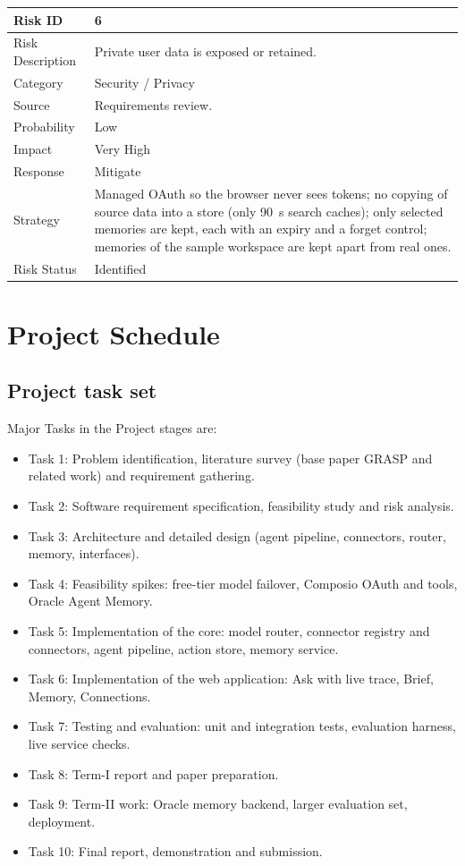 \begin{table}[!htbp]
\begin{center}
\def\arraystretch{1.5}
\begin{tabularx}{\textwidth}{| l | X |}
\hline
Risk ID	& 6 \\ \hline
Risk Description	& Private user data is exposed or retained. \\ \hline
Category	& Security / Privacy \\ \hline
Source	& Requirements review. \\ \hline
Probability	& Low \\ \hline
Impact	& Very High \\ \hline
Response	& Mitigate \\ \hline
Strategy	& Managed OAuth so the browser never sees tokens; no copying of source data into a store (only 90~s search caches); only selected memories are kept, each with an expiry and a forget control; memories of the sample workspace are kept apart from real ones. \\ \hline
Risk Status	& Identified \\ \hline
\end{tabularx}
\end{center}
\label{tab:risk6}
\end{table}

\section{Project Schedule}
\label{sec:schedule}
\subsection{Project task set}
\label{sec:taskset}
Major Tasks in the Project stages are:
\begin{itemize}
  \item Task 1: Problem identification, literature survey (base paper GRASP and related work) and requirement gathering.
  \item Task 2: Software requirement specification, feasibility study and risk analysis.
  \item Task 3: Architecture and detailed design (agent pipeline, connectors, router, memory, interfaces).
  \item Task 4: Feasibility spikes: free-tier model failover, Composio OAuth and tools, Oracle Agent Memory.
  \item Task 5: Implementation of the core: model router, connector registry and connectors, agent pipeline, action store, memory service.
  \item Task 6: Implementation of the web application: Ask with live trace, Brief, Memory, Connections.
  \item Task 7: Testing and evaluation: unit and integration tests, evaluation harness, live service checks.
  \item Task 8: Term-I report and paper preparation.
  \item Task 9: Term-II work: Oracle memory backend, larger evaluation set, deployment.
  \item Task 10: Final report, demonstration and submission.
\end{itemize}

